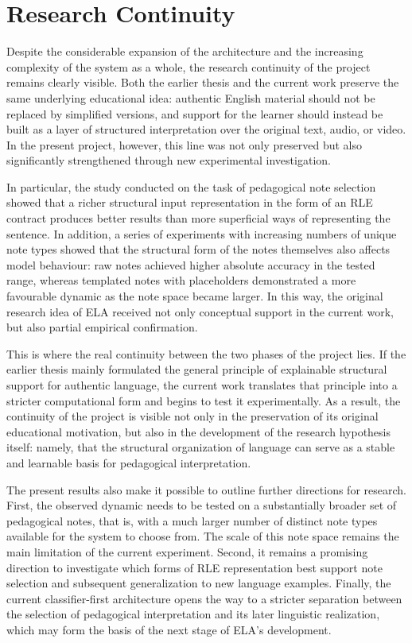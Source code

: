 \documentclass[12pt,a4paper,oneside]{report}
\begin{document}
\section{Research Continuity}
Despite the considerable expansion of the architecture and the increasing complexity of the system as a whole, the research continuity of the project remains clearly visible. Both the earlier thesis and the current work preserve the same underlying educational idea: authentic English material should not be replaced by simplified versions, and support for the learner should instead be built as a layer of structured interpretation over the original text, audio, or video. In the present project, however, this line was not only preserved but also significantly strengthened through new experimental investigation.

In particular, the study conducted on the task of pedagogical note selection showed that a richer structural input representation in the form of an RLE contract produces better results than more superficial ways of representing the sentence. In addition, a series of experiments with increasing numbers of unique note types showed that the structural form of the notes themselves also affects model behaviour: raw notes achieved higher absolute accuracy in the tested range, whereas templated notes with placeholders demonstrated a more favourable dynamic as the note space became larger. In this way, the original research idea of ELA received not only conceptual support in the current work, but also partial empirical confirmation.

This is where the real continuity between the two phases of the project lies. If the earlier thesis mainly formulated the general principle of explainable structural support for authentic language, the current work translates that principle into a stricter computational form and begins to test it experimentally. As a result, the continuity of the project is visible not only in the preservation of its original educational motivation, but also in the development of the research hypothesis itself: namely, that the structural organization of language can serve as a stable and learnable basis for pedagogical interpretation.

The present results also make it possible to outline further directions for research. First, the observed dynamic needs to be tested on a substantially broader set of pedagogical notes, that is, with a much larger number of distinct note types available for the system to choose from. The scale of this note space remains the main limitation of the current experiment. Second, it remains a promising direction to investigate which forms of RLE representation best support note selection and subsequent generalization to new language examples. Finally, the current classifier-first architecture opens the way to a stricter separation between the selection of pedagogical interpretation and its later linguistic realization, which may form the basis of the next stage of ELA's development.
\end{document}
